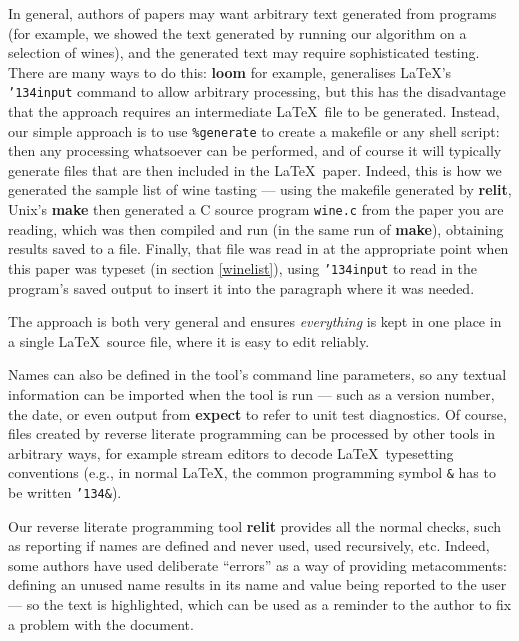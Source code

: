\documentclass[12pt]{article}
\def\name#1{\textbf{#1}}
\begin{document}
In general, authors of papers may want arbitrary text generated from programs (for example, we showed the text generated by running our algorithm on a selection of wines), and the generated text may require sophisticated testing. There are many ways to do this: \name{loom} for example, generalises \LaTeX's \texttt{\char'134input} command to allow arbitrary processing, but this has the disadvantage that the approach requires an intermediate \LaTeX\ file to be generated. Instead, our simple approach is to use \texttt{\%{}generate} to create a makefile or any shell script: then any processing whatsoever can be performed, and of course it will typically generate files that are then included in the \LaTeX\ paper. Indeed, this is how we generated the sample list of wine tasting --- using the makefile generated by \name{relit}, Unix's \name{make} then generated a C source program \texttt{wine.c} from the paper you are reading, which was then compiled and run (in the same run of \name{make}), obtaining results saved to a file. Finally, that file was read in at the appropriate point when this paper was typeset (in section \ref{winelist}), using \texttt{\char'134input} to read in the program's saved output to insert it into the paragraph where it was needed. 

The approach is both very general and ensures \emph{everything\/} is kept in one place in a single \LaTeX\ source file, where it is easy to edit reliably. 

Names can also be defined in the tool's command line parameters, so any textual information can be imported when the tool is run --- such as a version number, the date, or even output from \name{expect} to refer to unit test diagnostics. Of course, files created by reverse literate programming can be processed by other tools in arbitrary ways, for example stream editors to decode \LaTeX\ typesetting conventions (e.g., in normal \LaTeX, the common programming symbol \texttt{\&} has to be written \texttt{\char'134\&}).

Our reverse literate programming tool \name{relit} provides all the normal checks, such as reporting if names are defined and never used, used recursively, etc. 
Indeed, some authors have used deliberate ``errors'' as a way of providing metacomments: defining an unused name results in its name and value being reported to the user --- so the text is highlighted, which can be used as a reminder to the author to fix a problem with the document. 
\end{document}
